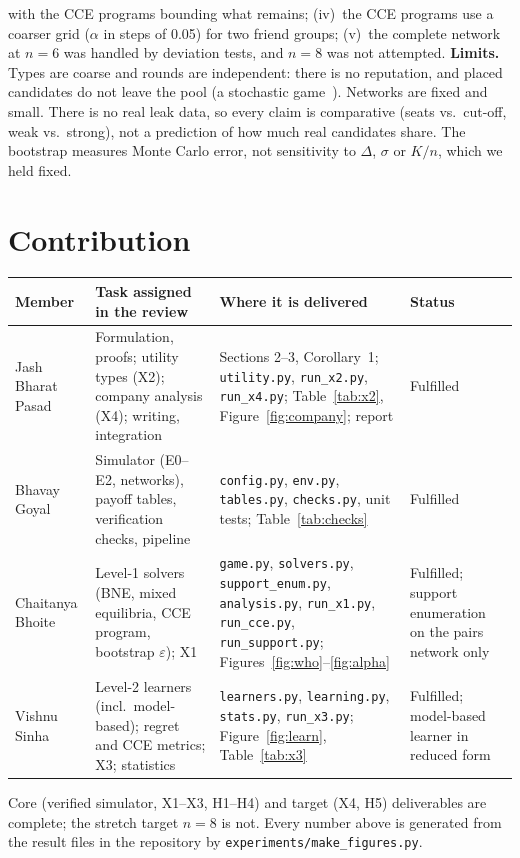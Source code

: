 \documentclass[10pt]{article}
\theoremstyle{plain}
\theoremstyle{definition}\newtheorem{definition}{Definition}
\begin{document}
with the CCE programs bounding what remains;
(iv)~the CCE programs use a coarser grid ($\alpha$ in steps of 0.05) for two friend groups; (v)~the complete network at $n=6$ was handled by deviation tests, and $n=8$ was not attempted.
\textbf{Limits.} Types are coarse and rounds are independent: there is no reputation, and placed candidates do not leave the pool (a stochastic game~\cite{shapley}). Networks are fixed and small.
There is no real leak data, so every claim is comparative (seats vs.\ cut-off, weak vs.\ strong), not a prediction of how much real candidates share.
The bootstrap measures Monte Carlo error, not sensitivity to $\Delta$, $\sigma$ or $K/n$, which we held fixed.

\section{Contribution}
{\centering\footnotesize
\begin{tabular}{@{}p{2.5cm}>{\raggedright\arraybackslash}p{5.3cm}>{\raggedright\arraybackslash}p{6.3cm}>{\raggedright\arraybackslash}p{2.3cm}@{}}
\toprule
Member & Task assigned in the review & Where it is delivered & Status\\\midrule
Jash Bharat Pasad & Formulation, proofs; utility types (X2); company analysis (X4); writing, integration &
Sections 2--3, Corollary~1; \texttt{utility.py}, \texttt{run\_x2.py}, \texttt{run\_x4.py}; Table~\ref{tab:x2}, Figure~\ref{fig:company}; report & Fulfilled\\
Bhavay Goyal & Simulator (E0--E2, networks), payoff tables, verification checks, pipeline &
\texttt{config.py}, \texttt{env.py}, \texttt{tables.py}, \texttt{checks.py}, unit tests; Table~\ref{tab:checks} & Fulfilled\\
Chaitanya Bhoite & Level-1 solvers (BNE, mixed equilibria, CCE program, bootstrap $\varepsilon$); X1 &
\texttt{game.py}, \texttt{solvers.py}, \texttt{support\_enum.py}, \texttt{analysis.py}, \texttt{run\_x1.py}, \texttt{run\_cce.py}, \texttt{run\_support.py}; Figures~\ref{fig:who}--\ref{fig:alpha} & Fulfilled; support enumeration on the pairs network only\\
Vishnu Sinha & Level-2 learners (incl.\ model-based); regret and CCE metrics; X3; statistics &
\texttt{learners.py}, \texttt{learning.py}, \texttt{stats.py}, \texttt{run\_x3.py}; Figure~\ref{fig:learn}, Table~\ref{tab:x3} & Fulfilled; model-based learner in reduced form\\
\bottomrule
\end{tabular}\par}
\vspace{3pt}
Core (verified simulator, X1--X3, H1--H4) and target (X4, H5) deliverables are complete; the stretch target $n=8$ is not.
Every number above is generated from the result files in the repository by \texttt{experiments/make\_figures.py}.
\end{document}
